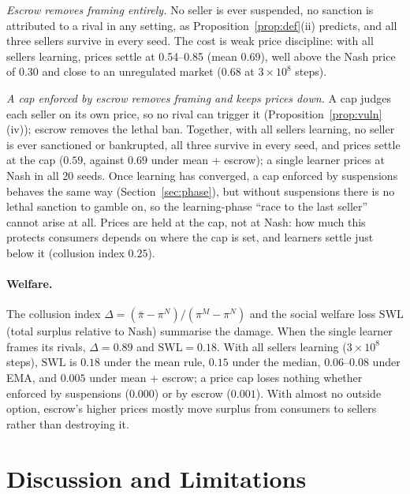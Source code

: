 \documentclass{article}
\begin{document}
\emph{Escrow removes framing entirely.} No seller is ever suspended, no sanction is attributed to a rival in any setting, as Proposition~\ref{prop:def}(ii) predicts, and all three sellers survive in every seed. The cost is weak price discipline: with all sellers learning, prices settle at 0.54--0.85 (mean 0.69), well above the Nash price of 0.30 and close to an unregulated market (0.68 at $3\times10^8$ steps).

\emph{A cap enforced by escrow removes framing and keeps prices down.} A cap judges each seller on its own price, so no rival can trigger it (Proposition~\ref{prop:vuln}(iv)); escrow removes the lethal ban. Together, with all sellers learning, no seller is ever sanctioned or bankrupted, all three survive in every seed, and prices settle at the cap ($0.59$, against $0.69$ under mean + escrow); a single learner prices at Nash in all 20 seeds. Once learning has converged, a cap enforced by suspensions behaves the same way (Section~\ref{sec:phase}), but without suspensions there is no lethal sanction to gamble on, so the learning-phase ``race to the last seller'' cannot arise at all. Prices are held at the cap, not at Nash: how much this protects consumers depends on where the cap is set, and learners settle just below it (collusion index $0.25$).

\paragraph{Welfare.} The collusion index $\Delta=(\bar\pi-\pi^N)/(\pi^M-\pi^N)$ and the social welfare loss $\mathrm{SWL}$ (total surplus relative to Nash) summarise the damage. When the single learner frames its rivals, $\Delta=0.89$ and $\mathrm{SWL}=0.18$. With all sellers learning ($3\times10^8$ steps), $\mathrm{SWL}$ is $0.18$ under the mean rule, $0.15$ under the median, $0.06$--$0.08$ under EMA, and $0.005$ under mean + escrow; a price cap loses nothing whether enforced by suspensions ($0.000$) or by escrow ($0.001$). With almost no outside option, escrow's higher prices mostly move surplus from consumers to sellers rather than destroying it.

\section{Discussion and Limitations}
\label{sec:discussion}
\end{document}
